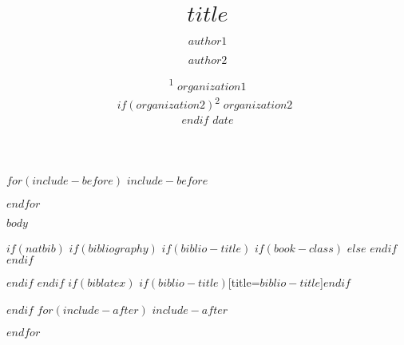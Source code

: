 \documentclass[$if(fontsize)$$fontsize$,$endif$$if(lang)$$babel-lang$,$endif$$if(papersize)$$papersize$paper,$endif$$for(classoption)$$classoption$$sep$,$endfor$]{$documentclass$}
\title{$title$}
\author{$author1$ \and $author2$}
\date{%
		\textsuperscript{1} $organization1$\\%
		$if(organization2)$\textsuperscript{2} $organization2$~\\[2ex]$endif$
		$date$
   }
\begin{document}
$for(include-before)$
$include-before$

$endfor$

$body$

$if(natbib)$
$if(bibliography)$
$if(biblio-title)$
$if(book-class)$
\renewcommand\bibname{$biblio-title$}
$else$
\renewcommand\refname{$biblio-title$}
$endif$
$endif$


$endif$
$endif$
$if(biblatex)$
\printbibliography$if(biblio-title)$[title=$biblio-title$]$endif$

$endif$
$for(include-after)$
$include-after$

$endfor$
\end{document}
